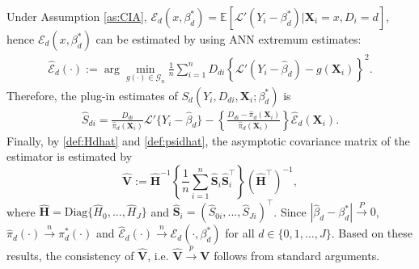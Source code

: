 \documentclass[11pt]{article}
\numberwithin{equation}{section}
\begin{document}
Under Assumption \ref{as:CIA}, $\mathcal{E}_d(x,{\beta}^*_d)=\mathbb{E}[ \mathcal{L}'(Y_i-{\beta}^*_d)|\boldsymbol{X}_{i}=x,D_i=d]$, hence  $\mathcal{E}_d(x,{\beta}^*_d)$ can be estimated by using ANN extremum estimates:
\begin{align}\label{eq:Ed_hat}
	\widehat{\mathcal{E}}_d(\cdot):=\arg\min_{g(\cdot)\in\mathcal{G}_n }\frac{1}{n}\sum_{i=1}^n D_{di}\left\{ \mathcal{L}'\left(Y_i-\widehat{\beta}_d\right)-g(\boldsymbol{X}_{i}) \right\}^2.
\end{align}
Therefore, the plug-in estimates of $S_d(Y_i,D_{di},\boldsymbol{X}_{i};{\beta}^*_d)$ is \begin{align}\label{def:psidhat}
	\widehat{S}_{di}=	\frac{D_{di}}{\widehat{\pi}_d(\boldsymbol{X}_{i})}\mathcal{L}'\{Y_i-\widehat{\beta}_d\}-\left\{\frac{D_{di}-\widehat{\pi}_d(\boldsymbol{X}_{i})}{\widehat{\pi}_d(\boldsymbol{X}_{i})}\right\}\widehat{\mathcal{E}}_d(\boldsymbol{X}_{i}).
\end{align}	
Finally, by \eqref{def:Hdhat} and \eqref{def:psidhat}, the asymptotic
covariance matrix of the estimator is estimated by
$$\widehat{\boldsymbol{V}}:=\widehat{\boldsymbol{H}}^{-1}\left\{ \frac{1}{n}\sum_{i=1}^{n}\widehat{\boldsymbol{S}}_i\widehat{\boldsymbol{S}}_i^{\top }\right\} (%
\widehat{\boldsymbol{H}}^{\top })^{-1},$$
where $\widehat{\boldsymbol{H}}=\text{Diag}\{\widehat{H}_0,...,\widehat{H}_J\}$ and $\widehat{\boldsymbol{S}}_i=(\widehat{S}_{0i},...,\widehat{S}_{Ji})^\top$.
Since $| \widehat{{\beta }}_d-{\beta }_d
^{\ast }| \xrightarrow{P} 0$, $\widehat{\pi}_d(\cdot)\xrightarrow{n}\pi_d^*(\cdot)$ and $\widehat{\mathcal{E}}_d(\cdot)\xrightarrow{n}\mathcal{E}_d(\cdot,\beta_d^*)$ for all $d\in \{0,1,...,J\}$.  Based on these results, the consistency of $\widehat{\boldsymbol{V}}$, i.e. $\widehat{\boldsymbol{V}}\xrightarrow{p}\boldsymbol{V}$ follows
from standard arguments.
\end{document}
